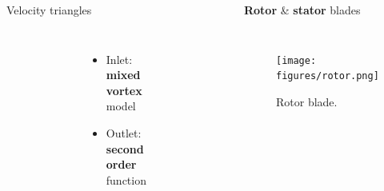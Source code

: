 \begin{columns}
{\begin{frame}{Velocity triangles}
\begin{columns}
\begin{figure}
				\end{figure}
				\begin{itemize}	
					\item Inlet: \textbf{mixed vortex} model
					\item Outlet: \textbf{second order} function 
				\end{itemize}
				\begin{figure}
					\centering
					\includegraphics[width=0.6\textwidth]{figures/statorVelocityTriangle.png}
				\end{figure}
		\end{columns}
	\end{frame}
	}
	\begin{frame}{\textbf{Rotor} \& \textbf{stator} blades}
		\begin{columns}
				\begin{figure}
					\hspace{-2cm}
					\texttt{[image: figures/rotor.png]}
					\caption{Rotor blade.}
				\end{figure}
				\begin{figure}

\end{figure}
\end{columns}
\end{frame}
\end{columns}
